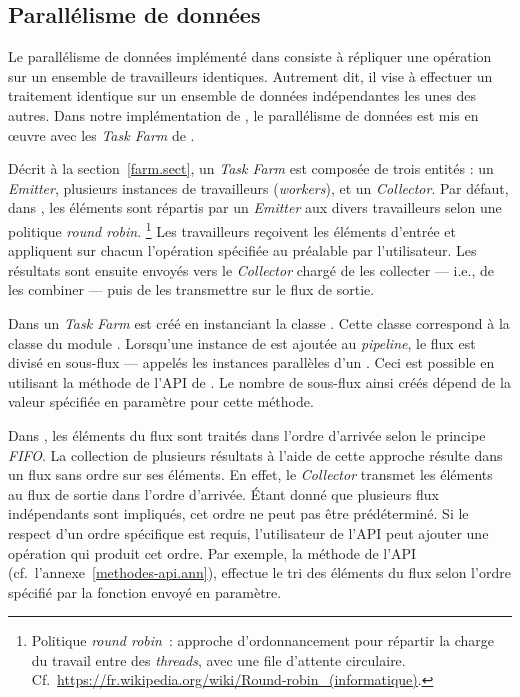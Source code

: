 \subsection{Parall\'elisme de donn\'ees}
\label{ParallelismeDeDonnees.sect}

Le parall\'elisme de donn\'ees impl\'ement\'e dans   consiste \`a r\'epliquer une op\'eration sur un ensemble de travailleurs identiques. Autrement dit, il vise \`a effectuer un traitement identique sur un ensemble de donn\'ees ind\'ependantes les unes des autres. 
%
Dans notre impl\'ementation de \PpFf, le parall\'elisme de donn\'ees est mis en \oe{}uvre avec les \emph{Task Farm} de .


D\'ecrit \`a la section~\ref{farm.sect}, un \emph{Task Farm} est compos\'ee de trois entit\'es : un \emph{Emitter}, plusieurs instances de travailleurs (\emph{workers}), et un \emph{Collector}. Par d\'efaut, dans \PpFf{}, les \'el\'ements sont r\'epartis par un \emph{Emitter} aux divers travailleurs selon une politique \emph{round robin}.%
%
\footnote{Politique \emph{round robin}~: approche d'ordonnancement pour r\'epartir la charge du travail entre des \emph{threads}, avec une file d'attente circulaire. Cf.~\url{https://fr.wikipedia.org/wiki/Round-robin_(informatique)}.} 
%
Les travailleurs re\c{c}oivent les \'el\'ements d'entr\'ee et appliquent sur chacun l'op\'eration sp\'ecifi\'ee au pr\'ealable par l'utilisateur. Les r\'esultats sont ensuite envoy\'es vers le \emph{Collector} charg\'e de les collecter --- i.e., de les combiner --- puis de les transmettre sur le flux de sortie.

Dans  un \emph{Task Farm} est cr\'e\'e en instanciant la classe . Cette classe correspond \`a la classe  du module . Lorsqu'une instance de  est ajout\'ee au \emph{pipeline}, le flux est divis\'e en sous-flux --- appel\'es les instances parall\`eles d'un . Ceci est possible en utilisant la m\'ethode  de l'API de . Le nombre de sous-flux ainsi cr\'e\'es d\'epend de la valeur sp\'ecifi\'ee en param\`etre pour cette m\'ethode.  

Dans , les \'el\'ements du flux sont trait\'es dans l'ordre d'arriv\'ee selon le principe \emph{FIFO}. La collection de plusieurs r\'esultats \`a l'aide de cette approche r\'esulte dans un flux sans ordre sur ses \'el\'ements. En effet, le \emph{Collector} transmet les \'el\'ements au flux de sortie dans l'ordre d'arriv\'ee. \'Etant donn\'e que plusieurs flux ind\'ependants sont impliqu\'es, cet ordre ne peut pas \^etre pr\'ed\'etermin\'e. Si le respect d'un  ordre sp\'ecifique est requis, l'utilisateur de l'API peut ajouter une op\'eration qui produit cet ordre. Par exemple, la m\'ethode  de l'API (cf.~l'annexe~\ref{methodes-api.ann}), effectue le tri des \'el\'ements du flux selon l'ordre sp\'ecifi\'e par la fonction  envoy\'e en param\`etre.

